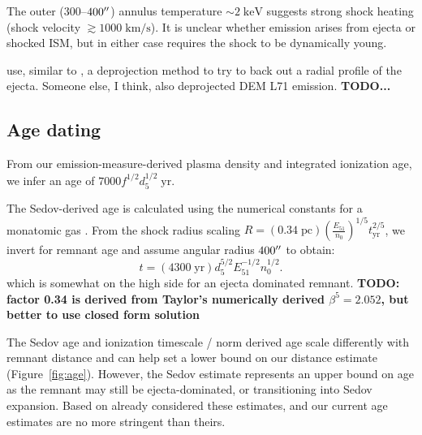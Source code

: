 \documentclass[preprint2,tighten,trackchanges]{aastex6}
\newcommand*{\mt}{\mathrm}
\newcommand*{\unit}[1]{\;\mt{#1}}  %
\newcommand*{\abt}{\mathord{\sim}} %
\begin{document}
The outer ($300$--$400\mbox{$^{\prime\prime}$}$) annulus temperature $\abt 2 \unit{keV}$
suggests strong shock heating (shock velocity $\gtrsim 1000 \unit{km/s}$).
It is unclear whether emission arises from ejecta or shocked ISM, but in either
case requires the shock to be dynamically young.

\citet{katsuda2015} use, similar to \citet{kosenko2010}, a deprojection method
to try to back out a radial profile of the ejecta.
Someone else, \citet{hughes2003} I think, also deprojected DEM L71 emission.
\textbf{TODO...}

\subsection{Age dating}

From our emission-measure-derived plasma density and integrated ionization age,
we infer an age of $7000 f^{1/2} d_{5}^{1/2} \unit{yr}$.

The Sedov-derived age \citep{taylor1950, sedov1959} is calculated using the
numerical constants for a monatomic gas \citet{taylor1950-pt2}.
From the shock radius scaling
$R = (0.34 \unit{pc}) \left( \frac{E_{51}}{n_0} \right)^{1/5} t_{\mt{yr}}^{2/5}$,
we invert for remnant age and assume angular radius $400\mbox{$^{\prime\prime}$}$ to obtain:
\[
    t = (4300 \unit{yr}) d_5^{5/2} E_{51}^{-1/2} n_0^{1/2} .
\]
which is somewhat on the high side for an ejecta dominated remnant.
\textbf{TODO: factor 0.34 is derived from Taylor's numerically derived
$\beta^5 = 2.052$, but better to use closed form solution}

The Sedov age and ionization timescale / norm derived age scale differently
with remnant distance and can help set a lower bound on our distance estimate
(Figure~\ref{fig:age}).
However, the Sedov estimate represents an upper bound on age as the remnant
may still be ejecta-dominated, or transitioning into Sedov expansion.
Based on
\citet{rakowski2001} already considered these estimates, and our current age
estimates are no more stringent than theirs.
\end{document}
